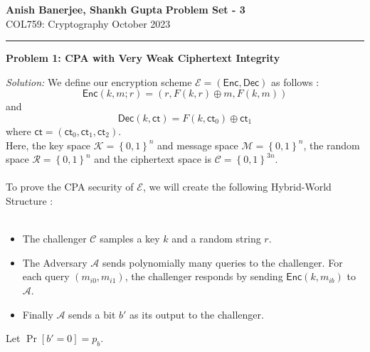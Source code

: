 \documentclass[a4paper, 11pt]{article}
\newcommand{\hr}{\noindent\rule{7in}{2.8pt}}
\newenvironment{solution}
    {\textit{Solution:}}
    {\clearpage}
\newcommand{\prob}[1]{\begin{mdframed}[backgroundcolor=gray!20] \textbf{Problem #1}\end{mdframed}}
\newcommand{\bit}{\left\{0, 1\right\}}
\newcommand{\ct}{\mathsf{ct}}
\newcommand{\enc}{\mathsf{Enc}}
\newcommand{\calA}{\mathcal{A}}
\newcommand{\calC}{\mathcal{C}}
\newcommand{\calE}{\mathcal{E}}
\newcommand{\calK}{\mathcal{K}}
\newcommand{\calM}{\mathcal{M}}
\newcommand{\calR}{\mathcal{R}}
\begin{document}
\noindent
\large\textbf{Anish Banerjee, Shankh Gupta} \hfill \textbf{Problem Set - 3}   \\
\normalsize COL759: Cryptography \hfill October 2023\\
\hr


\prob{1: CPA with Very Weak Ciphertext Integrity}
\begin{solution}
    We define our encryption scheme $\calE = (\mathsf{Enc, Dec})$  as follows :
    $$\mathsf{Enc}(k, m; r) = (r, F(k, r) \oplus m, F(k, m))$$ and
    $$\mathsf{Dec}(k, \ct) = F(k, \ct_0) \oplus \ct_1$$ where $\ct = (\ct_0, \ct_1, \ct_2)$. \\
    Here, the key space $\calK = \bit^n$ and message space $\calM = \bit^n$, the random space $\calR = \bit^n$ and the ciphertext space is $\calC = \bit^{3n}$. \\ \\
    To prove the CPA security of $\calE$, we will create the following Hybrid-World Structure : \\ \\
    \begin{world}[World-b :]
        \begin{itemize}
            \item The challenger $\calC$ samples a key $k$ and a random string $r$.
            \item The Adversary $\calA$ sends polynomially many queries to the challenger. For each query $(m_{i0}, m_{i1})$, the challenger responds by sending $\enc(k, m_{ib})$ to $\calA$.
            \item Finally $\calA$ sends a bit $b'$ as its output to the challenger.
        \end{itemize}
        Let $\Pr[b' = 0] = p_b$.
    \end{world}


\end{solution}
\end{document}
